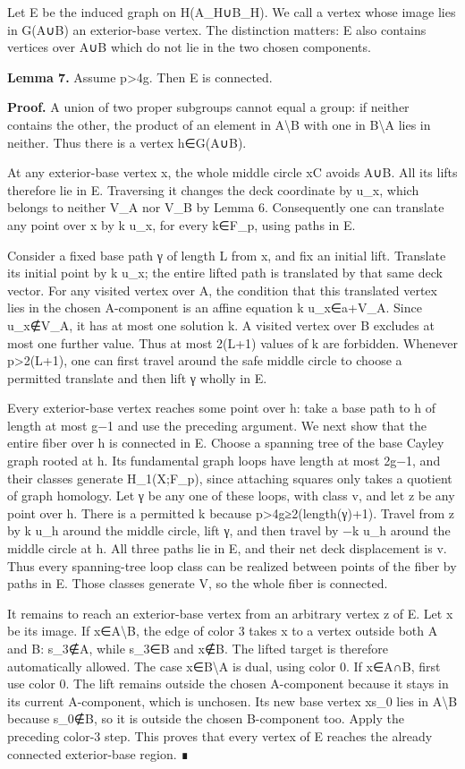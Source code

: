 \documentclass[
  11pt,
  a4paper,
]{article}
\begin{document}
Let E be the induced graph on H(A\_H∪B\_H). We call a vertex whose image
lies in G(A∪B) an exterior-base vertex. The distinction matters: E also
contains vertices over A∪B which do not lie in the two chosen
components.

\textbf{Lemma 7.} Assume p\textgreater4g. Then E is connected.

\textbf{Proof.} A union of two proper subgroups cannot equal a group: if
neither contains the other, the product of an element in
A\textbackslash B with one in B\textbackslash A lies in neither. Thus
there is a vertex h∈G(A∪B).

At any exterior-base vertex x, the whole middle circle xC avoids A∪B.
All its lifts therefore lie in E. Traversing it changes the deck
coordinate by u\_x, which belongs to neither V\_A nor V\_B by Lemma 6.
Consequently one can translate any point over x by k u\_x, for every
k∈F\_p, using paths in E.

Consider a fixed base path γ of length L from x, and fix an initial
lift. Translate its initial point by k u\_x; the entire lifted path is
translated by that same deck vector. For any visited vertex over A, the
condition that this translated vertex lies in the chosen A-component is
an affine equation k u\_x∈a+V\_A. Since u\_x∉V\_A, it has at most one
solution k. A visited vertex over B excludes at most one further value.
Thus at most 2(L+1) values of k are forbidden. Whenever
p\textgreater2(L+1), one can first travel around the safe middle circle
to choose a permitted translate and then lift γ wholly in E.

Every exterior-base vertex reaches some point over h: take a base path
to h of length at most g−1 and use the preceding argument. We next show
that the entire fiber over h is connected in E. Choose a spanning tree
of the base Cayley graph rooted at h. Its fundamental graph loops have
length at most 2g−1, and their classes generate H\_1(X;F\_p), since
attaching squares only takes a quotient of graph homology. Let γ be any
one of these loops, with class v, and let z be any point over h. There
is a permitted k because p\textgreater4g≥2(length(γ)+1). Travel from z
by k u\_h around the middle circle, lift γ, and then travel by −k u\_h
around the middle circle at h. All three paths lie in E, and their net
deck displacement is v. Thus every spanning-tree loop class can be
realized between points of the fiber by paths in E. Those classes
generate V, so the whole fiber is connected.

It remains to reach an exterior-base vertex from an arbitrary vertex z
of E. Let x be its image. If x∈A\textbackslash B, the edge of color 3
takes x to a vertex outside both A and B: s\_3∉A, while s\_3∈B and x∉B.
The lifted target is therefore automatically allowed. The case
x∈B\textbackslash A is dual, using color 0. If x∈A∩B, first use color 0.
The lift remains outside the chosen A-component because it stays in its
current A-component, which is unchosen. Its new base vertex xs\_0 lies
in A\textbackslash B because s\_0∉B, so it is outside the chosen
B-component too. Apply the preceding color-3 step. This proves that
every vertex of E reaches the already connected exterior-base region. ∎
\end{document}
